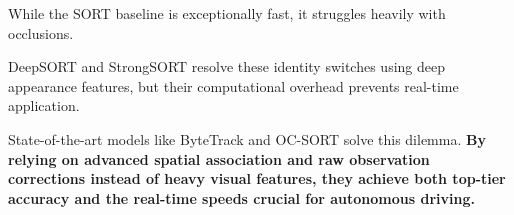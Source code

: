 \documentclass[10pt,twocolumn,letterpaper]{article}
\begin{document}
While the SORT baseline is exceptionally fast, it struggles heavily with occlusions.

DeepSORT and StrongSORT resolve these identity switches using deep appearance features, but their computational overhead prevents real-time application.

State-of-the-art models like ByteTrack and OC-SORT solve this dilemma. \textbf{By relying on advanced spatial association and raw observation corrections instead of heavy visual features, they achieve both top-tier accuracy and the real-time speeds crucial for autonomous driving.}
\newpage


\end{document}
